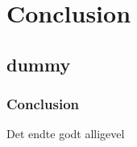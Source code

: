 \documentclass{beamer}
\begin{document}
\section{Conclusion}

\subsection{dummy}
\begin{frame}
	\frametitle{Conclusion}
	Det endte godt alligevel
\end{frame}
\end{document}
